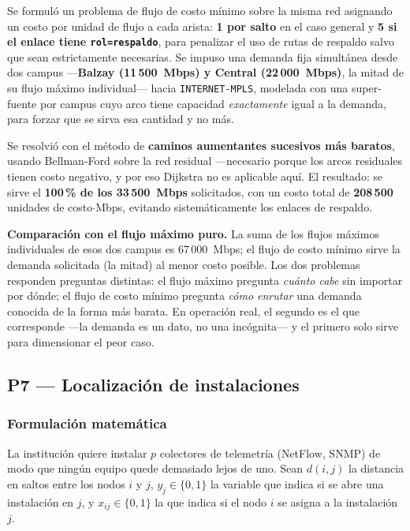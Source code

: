 \documentclass[10pt,a4paper]{extarticle}
\newcommand{\code}[1]{\texttt{\small #1}}
\begin{document}
Se formuló un problema de flujo de costo mínimo sobre la misma red asignando un costo por
unidad de flujo a cada arista: \textbf{1 por salto} en el caso general y \textbf{5 si el
enlace tiene \code{rol=respaldo}}, para penalizar el uso de rutas de respaldo salvo que sean
estrictamente necesarias. Se impuso una demanda fija simultánea desde dos campus
---\textbf{Balzay (11\,500~Mbps) y Central (22\,000~Mbps)}, la mitad de su flujo máximo
individual--- hacia \code{INTERNET-MPLS}, modelada con una super-fuente por campus cuyo arco
tiene capacidad \textit{exactamente} igual a la demanda, para forzar que se sirva esa
cantidad y no más.

Se resolvió con el método de \textbf{caminos aumentantes sucesivos más baratos}, usando
Bellman-Ford sobre la red residual ---necesario porque los arcos residuales tienen costo
negativo, y por eso Dijkstra no es aplicable aquí. El resultado: se sirve el
\textbf{100\,\% de los 33\,500~Mbps} solicitados, con un costo total de
\textbf{208\,500} unidades de costo$\cdot$Mbps, evitando sistemáticamente los enlaces de
respaldo.

\textbf{Comparación con el flujo máximo puro.} La suma de los flujos máximos individuales de
esos dos campus es 67\,000~Mbps; el flujo de costo mínimo sirve la demanda solicitada
(la mitad) al menor costo posible. Los dos problemas responden preguntas distintas: el flujo
máximo pregunta \textit{cuánto cabe} sin importar por dónde; el flujo de costo mínimo
pregunta \textit{cómo enrutar} una demanda conocida de la forma más barata. En operación
real, el segundo es el que corresponde ---la demanda es un dato, no una incógnita--- y el
primero solo sirve para dimensionar el peor caso.

\subsection{P7 --- Localización de instalaciones}

\subsubsection{Formulación matemática}

La institución quiere instalar $p$ colectores de telemetría (NetFlow, SNMP) de modo que
ningún equipo quede demasiado lejos de uno. Sean $d(i,j)$ la distancia en saltos entre los
nodos $i$ y $j$, $y_j \in \{0,1\}$ la variable que indica si se abre una instalación en $j$,
y $x_{ij} \in \{0,1\}$ la que indica si el nodo $i$ se asigna a la instalación $j$.
\end{document}
